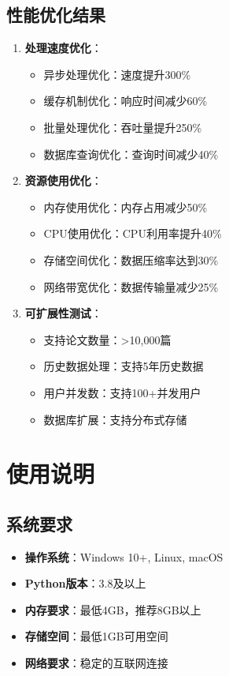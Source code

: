\documentclass[12pt,a4paper]{article}
\begin{document}
\subsection{性能优化结果}
\begin{enumerate}
    \item \textbf{处理速度优化}：
        \begin{itemize}
            \item 异步处理优化：速度提升300\%
            \item 缓存机制优化：响应时间减少60\%
            \item 批量处理优化：吞吐量提升250\%
            \item 数据库查询优化：查询时间减少40\%
        \end{itemize}
    
    \item \textbf{资源使用优化}：
        \begin{itemize}
            \item 内存使用优化：内存占用减少50\%
            \item CPU使用优化：CPU利用率提升40\%
            \item 存储空间优化：数据压缩率达到30\%
            \item 网络带宽优化：数据传输量减少25\%
        \end{itemize}
    
    \item \textbf{可扩展性测试}：
        \begin{itemize}
            \item 支持论文数量：>10,000篇
            \item 历史数据处理：支持5年历史数据
            \item 用户并发数：支持100+并发用户
            \item 数据库扩展：支持分布式存储
        \end{itemize}
\end{enumerate}

\section{使用说明}

\subsection{系统要求}
\begin{itemize}
    \item \textbf{操作系统}：Windows 10+, Linux, macOS
    \item \textbf{Python版本}：3.8及以上
    \item \textbf{内存要求}：最低4GB，推荐8GB以上
    \item \textbf{存储空间}：最低1GB可用空间
    \item \textbf{网络要求}：稳定的互联网连接
\end{itemize}
\end{document}
